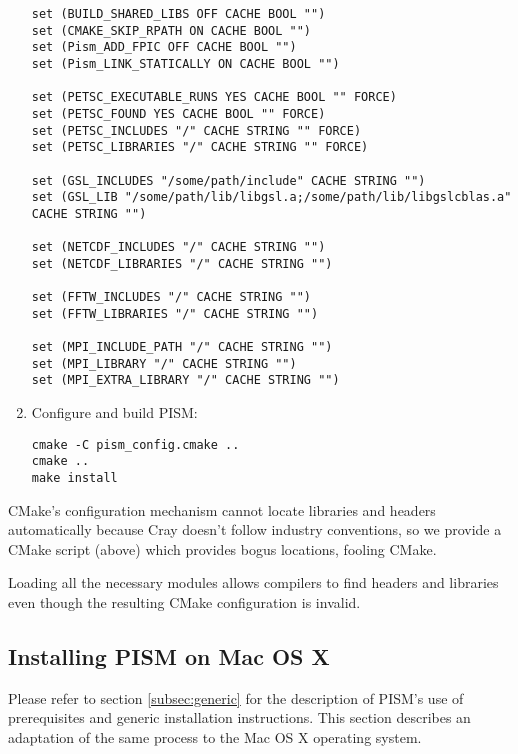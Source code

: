 \documentclass[titlepage,letterpaper,final]{scrartcl}
\begin{document}
\begin{enumerate}
\begin{verbatim}
set (BUILD_SHARED_LIBS OFF CACHE BOOL "")
set (CMAKE_SKIP_RPATH ON CACHE BOOL "")
set (Pism_ADD_FPIC OFF CACHE BOOL "")
set (Pism_LINK_STATICALLY ON CACHE BOOL "")

set (PETSC_EXECUTABLE_RUNS YES CACHE BOOL "" FORCE)
set (PETSC_FOUND YES CACHE BOOL "" FORCE)
set (PETSC_INCLUDES "/" CACHE STRING "" FORCE)
set (PETSC_LIBRARIES "/" CACHE STRING "" FORCE)

set (GSL_INCLUDES "/some/path/include" CACHE STRING "")
set (GSL_LIB "/some/path/lib/libgsl.a;/some/path/lib/libgslcblas.a" CACHE STRING "")

set (NETCDF_INCLUDES "/" CACHE STRING "")
set (NETCDF_LIBRARIES "/" CACHE STRING "")

set (FFTW_INCLUDES "/" CACHE STRING "")
set (FFTW_LIBRARIES "/" CACHE STRING "")

set (MPI_INCLUDE_PATH "/" CACHE STRING "")
set (MPI_LIBRARY "/" CACHE STRING "")
set (MPI_EXTRA_LIBRARY "/" CACHE STRING "")
\end{verbatim}
\item Configure and build PISM:
\begin{verbatim}
cmake -C pism_config.cmake ..
cmake ..
make install
\end{verbatim}
\end{enumerate}

CMake's configuration mechanism cannot locate libraries and headers
automatically because Cray doesn't follow industry conventions, so we provide a
CMake script (above) which provides bogus locations, fooling CMake.

Loading all the necessary modules allows compilers to find headers and
libraries even though the resulting CMake configuration is invalid.

\subsection{Installing PISM on Mac OS X}  \label{subsec:macosx}

Please refer to section \ref{subsec:generic} for the description of PISM's use of prerequisites and generic installation
instructions. This section describes an adaptation of the same process to the Mac OS X operating system.
\end{document}
